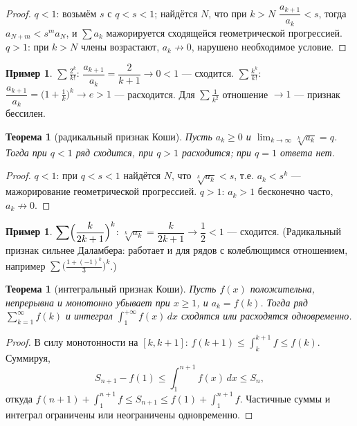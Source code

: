 \documentclass[11pt,a4paper]{article}
\theoremstyle{definition}
\newtheorem{example}[definition]{Пример}
\theoremstyle{plain}
\newtheorem{theorem}[definition]{Теорема}
\newcommand{\dx}{\,dx}
\renewcommand{\le}{\leqslant}
\renewcommand{\ge}{\geqslant}
\begin{document}
\begin{proof}
$q<1$: возьмём $s$ с $q<s<1$; найдётся $N$, что при $k>N$ $\dfrac{a_{k+1}}{a_k}<s$, тогда
$a_{N+m}<s^m a_N$, и $\sum a_k$ мажорируется сходящейся геометрической прогрессией. $q>1$: при
$k>N$ члены возрастают, $a_k\not\to0$, нарушено необходимое условие.
\end{proof}

\begin{example}
$\displaystyle\sum\frac{2^k}{k!}$: $\dfrac{a_{k+1}}{a_k}=\dfrac{2}{k+1}\to0<1$ — сходится.
$\displaystyle\sum\frac{k^k}{k!}$: $\dfrac{a_{k+1}}{a_k}=\bigl(1+\tfrac1k\bigr)^k\to e>1$ —
расходится. Для $\sum\frac1{k^2}$ отношение $\to1$ — признак бессилен.
\end{example}

\begin{theorem}[радикальный признак Коши]
Пусть $a_k\ge0$ и $\displaystyle\lim_{k\to\infty}\sqrt[k]{a_k}=q$. Тогда при $q<1$ ряд сходится,
при $q>1$ расходится; при $q=1$ ответа нет.
\end{theorem}

\begin{proof}
$q<1$: при $q<s<1$ найдётся $N$, что $\sqrt[k]{a_k}<s$, т.е. $a_k<s^k$ — мажорирование
геометрической прогрессией. $q>1$: $a_k>1$ бесконечно часто, $a_k\not\to0$.
\end{proof}

\begin{example}
$\displaystyle\sum\Bigl(\frac{k}{2k+1}\Bigr)^k$: $\sqrt[k]{a_k}=\dfrac{k}{2k+1}\to\dfrac12<1$ —
сходится. (Радикальный признак сильнее Даламбера: работает и для рядов с колеблющимся
отношением, например $\sum\bigl(\tfrac{1+(-1)^k}{3}\bigr)^k$.)
\end{example}

\begin{theorem}[интегральный признак Коши]
Пусть $f(x)$ положительна, непрерывна и монотонно убывает при $x\ge1$, и $a_k=f(k)$. Тогда ряд
$\displaystyle\sum_{k=1}^\infty f(k)$ и интеграл $\displaystyle\int_1^{+\infty}f(x)\dx$ сходятся
или расходятся одновременно.
\end{theorem}

\begin{proof}
В силу монотонности на $[k,k+1]$: $f(k+1)\le\int_k^{k+1}f\le f(k)$. Суммируя,
\[
  S_{n+1}-f(1)\le\int_1^{n+1}f(x)\dx\le S_n ,
\]
откуда $f(n+1)+\int_1^{n+1}f\le S_{n+1}\le f(1)+\int_1^{n+1}f$. Частичные суммы и интеграл
ограничены или неограничены одновременно.
\end{proof}
\end{document}
